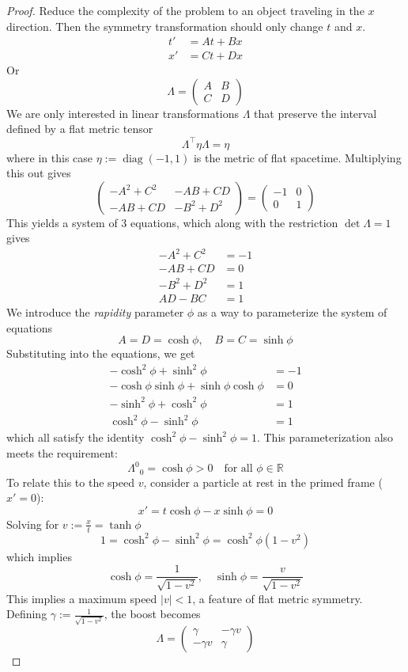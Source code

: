 \documentclass{amsart}
\theoremstyle{remark}
\DeclareMathOperator{\diag}{diag}
\begin{document}
\begin{proof}
  Reduce the complexity of the problem to an object traveling in the $x$ direction. Then the symmetry transformation should only change $t$ and $x$.
  \[
  \begin{aligned}
    t' &= A t + B x \\
    x' &= C t + D x
  \end{aligned}
  \]
  Or
  \[
  \Lambda =
  \begin{pmatrix}
    A & B \\
    C & D
  \end{pmatrix}
  \]
  We are only interested in linear transformations $\Lambda$ that preserve the interval defined by a flat metric tensor
  \[
  \Lambda^\top \eta \Lambda = \eta
  \]
  where in this case $\eta := \diag(-1, 1)$ is the metric of flat spacetime. Multiplying this out gives
  \[
  \begin{pmatrix}
    -A^2 + C^2 & -AB + CD \\
    -AB + CD & -B^2 + D^2
  \end{pmatrix} =
  \begin{pmatrix}
    -1 & 0 \\
    0 & 1
  \end{pmatrix}
  \]
  This yields a system of 3 equations, which along with the restriction $\det \Lambda = 1$ gives
  \[
  \begin{aligned}
    - A^2 + C^2 &= -1 \\
    - AB + CD &= 0 \\
    - B^2 + D^2 &= 1 \\
    AD - BC &= 1
  \end{aligned}
  \]
  We introduce the \emph{rapidity} parameter $\phi$ as a way to parameterize the system of equations
  \[
  A = D = \cosh \phi, \quad B = C = \sinh \phi
  \]
  Substituting into the equations, we get
  \[
  \begin{aligned}
    - \cosh^2 \phi + \sinh^2 \phi &= -1 \\
    - \cosh \phi \sinh \phi + \sinh \phi \cosh \phi &= 0 \\
    - \sinh^2 \phi + \cosh^2 \phi &= 1 \\
    \cosh^2 \phi - \sinh^2 \phi &= 1
  \end{aligned}
  \]
  which all satisfy the identity $\cosh^2 \phi - \sinh^2 \phi = 1$. This parameterization also meets the requirement:
  \[
  \Lambda^0{}_0 = \cosh \phi > 0 \quad \text{for all } \phi \in \mathbb{R}
  \]
  To relate this to the speed $v$, consider a particle at rest in the primed frame ($x' = 0$):
  \[
  x' = t \cosh \phi - x \sinh \phi = 0
  \]
  Solving for $v := \frac{x}{t} = \tanh \phi$
  \[
  1 = \cosh^2 \phi - \sinh^2 \phi = \cosh^2 \phi (1 - v^2)
  \]
  which implies
  \[
  \cosh \phi = \frac{1}{\sqrt{1 - v^2}}, \quad \sinh \phi = \frac{v}{\sqrt{1 - v^2}}
  \]
  This implies a maximum speed $|v| < 1$, a feature of flat metric symmetry. Defining $\gamma := \frac{1}{\sqrt{1 - v^2}}$, the boost becomes
  \[
  \Lambda =
  \begin{pmatrix}
    \gamma & -\gamma v \\
    -\gamma v & \gamma
  \end{pmatrix}
  \]
\end{proof}
\end{document}
